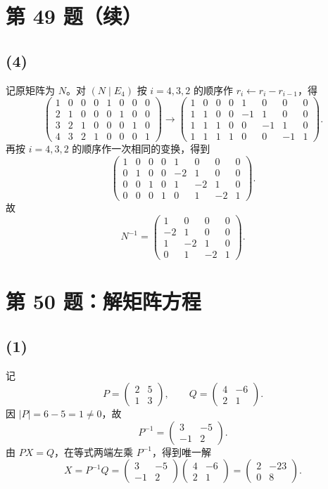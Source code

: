 \documentclass[11pt,a4paper,fontset=fandol]{ctexart}
\newcommand{\ans}[1]{\boxed{#1}}
\newcommand{\problem}[1]{\Needspace{8\baselineskip}\section*{#1}}
\newcommand{\parttitle}[1]{\Needspace{7\baselineskip}\subsection*{#1}}
\begin{document}
\section*{第 49 题（续）}
\parttitle{(4)}
记原矩阵为 $N$。对 $(N\mid E_4)$ 按 $i=4,3,2$ 的顺序作
$r_i\leftarrow r_i-r_{i-1}$，得
\[
\left(\begin{array}{rrrr|rrrr}
1&0&0&0&1&0&0&0\\
2&1&0&0&0&1&0&0\\
3&2&1&0&0&0&1&0\\
4&3&2&1&0&0&0&1
\end{array}\right)
\longrightarrow
\left(\begin{array}{rrrr|rrrr}
1&0&0&0&1&0&0&0\\
1&1&0&0&-1&1&0&0\\
1&1&1&0&0&-1&1&0\\
1&1&1&1&0&0&-1&1
\end{array}\right).
\]
再按 $i=4,3,2$ 的顺序作一次相同的变换，得到
\[
\left(\begin{array}{rrrr|rrrr}
1&0&0&0&1&0&0&0\\
0&1&0&0&-2&1&0&0\\
0&0&1&0&1&-2&1&0\\
0&0&0&1&0&1&-2&1
\end{array}\right).
\]
故
\[
\ans{N^{-1}=\begin{pmatrix}
1&0&0&0\\-2&1&0&0\\1&-2&1&0\\0&1&-2&1
\end{pmatrix}}.
\]

\problem{第 50 题：解矩阵方程}
\parttitle{(1)}
记
\[
P=\begin{pmatrix}2&5\\1&3\end{pmatrix},\qquad
Q=\begin{pmatrix}4&-6\\2&1\end{pmatrix}.
\]
因 $|P|=6-5=1\ne0$，故
\[
P^{-1}=\begin{pmatrix}3&-5\\-1&2\end{pmatrix}.
\]
由 $PX=Q$，在等式两端左乘 $P^{-1}$，得到唯一解
\[
\ans{X=P^{-1}Q
=\begin{pmatrix}3&-5\\-1&2\end{pmatrix}
\begin{pmatrix}4&-6\\2&1\end{pmatrix}
=\begin{pmatrix}2&-23\\0&8\end{pmatrix}}.
\]
\end{document}
